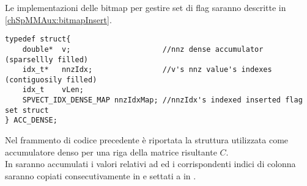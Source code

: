 Le implementazioni delle bitmap per gestire set di flag saranno descritte in \ref{chSpMMAux:bitmapInsert}.\\
\begin{lstlisting}
typedef struct{
    double*  v;                     //nnz dense accumulator		(sparsellly filled)
    idx_t*   nnzIdx;                //v's nnz value's indexes		(contiguosily filled)
    idx_t    vLen;
    SPVECT_IDX_DENSE_MAP nnzIdxMap; //nnzIdx's indexed inserted flag set struct
} ACC_DENSE;
\end{lstlisting}
Nel frammento di codice precedente è riportata la struttura utilizzata come accumulatore denso per una riga della matrice risultante $C$.\\
In  saranno accumulati i valori \nnz relativi ad  ed i corrispondenti indici di colonna 
saranno copiati consecutivamente in  e settati a  in .

